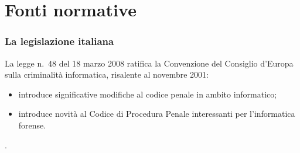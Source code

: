 \documentclass[11pt]{beamer}
\begin{document}
	
	\section{Fonti normative}
	\begin{frame}
		\frametitle{La legislazione italiana}
		La legge n.~48 del 18 marzo 2008\cite{L_48/2008_2016-03-04} ratifica la Convenzione del Consiglio d'Europa sulla criminalità informatica, risalente al novembre 2001:
		\begin{itemize}
			\item introduce significative modifiche al codice penale in ambito informatico;
			\item introduce novità al Codice di Procedura Penale interessanti per l'informatica forense.
		\end{itemize}. 
	\end{frame}
	
\end{document}
